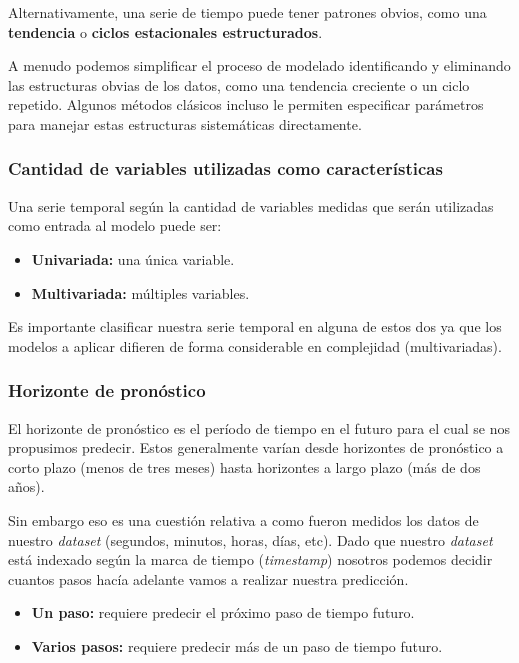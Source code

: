 \documentclass[a4paper,12pt]{article}
\begin{document}
Alternativamente, una serie de tiempo puede tener patrones obvios, como una \textbf{tendencia} o \textbf{ciclos estacionales estructurados}.

A menudo podemos simplificar el proceso de modelado identificando y eliminando las estructuras obvias de los datos, como una tendencia creciente o un ciclo repetido. Algunos métodos clásicos incluso le permiten especificar parámetros para manejar estas estructuras sistemáticas directamente.

\subsubsection{Cantidad de variables utilizadas como características}

Una serie temporal según la cantidad de variables medidas que serán utilizadas como entrada al modelo puede ser:
\begin{itemize}
	\item \textbf{Univariada:} una única variable.
	\item \textbf{Multivariada:} múltiples variables. 
\end{itemize}

Es importante clasificar nuestra serie temporal en alguna de estos dos ya que los modelos a aplicar difieren de forma considerable en complejidad (multivariadas).

\subsubsection{Horizonte de pronóstico}

El horizonte de pronóstico es el período de tiempo en el futuro para el cual se nos propusimos predecir. Estos generalmente varían desde horizontes de pronóstico a corto plazo (menos de tres meses) hasta horizontes a largo plazo (más de dos años).

Sin embargo eso es una cuestión relativa a como fueron medidos los datos de nuestro \textit{dataset} (segundos, minutos, horas, días, etc). Dado que nuestro \textit{dataset} está indexado según la marca de tiempo (\textit{timestamp}) nosotros podemos decidir cuantos pasos hacía adelante vamos a realizar nuestra predicción.

\begin{itemize}
	\item \textbf{Un paso:} requiere predecir el próximo paso de tiempo futuro.
	\item \textbf{Varios pasos:} requiere predecir más de un paso de tiempo futuro.
\end{itemize}
\end{document}
